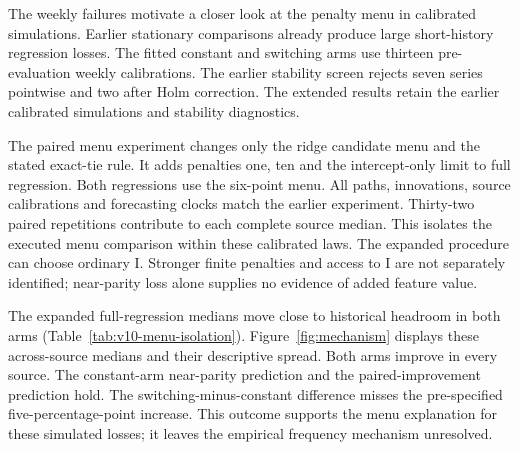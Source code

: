 \documentclass[10pt,a4paper]{article}
\begin{document}
The weekly failures motivate a closer look at the penalty menu in calibrated simulations. Earlier stationary comparisons already produce large short-history regression losses. The fitted constant and switching arms use thirteen pre-evaluation weekly calibrations. The earlier stability screen rejects seven series pointwise and two after Holm correction. The extended results retain the earlier calibrated simulations and stability diagnostics.

The paired menu experiment changes only the ridge candidate menu and the stated exact-tie rule. It adds penalties one, ten and the intercept-only limit to full regression. Both regressions use the six-point menu. All paths, innovations, source calibrations and forecasting clocks match the earlier experiment. Thirty-two paired repetitions contribute to each complete source median. This isolates the executed menu comparison within these calibrated laws. The expanded procedure can choose ordinary I. Stronger finite penalties and access to I are not separately identified; near-parity loss alone supplies no evidence of added feature value.

The expanded full-regression medians move close to historical headroom in both arms (Table~\ref{tab:v10-menu-isolation}). Figure~\ref{fig:mechanism} displays these across-source medians and their descriptive spread. Both arms improve in every source. The constant-arm near-parity prediction and the paired-improvement prediction hold. The switching-minus-constant difference misses the pre-specified five-percentage-point increase. This outcome supports the menu explanation for these simulated losses; it leaves the empirical frequency mechanism unresolved.
\end{document}
